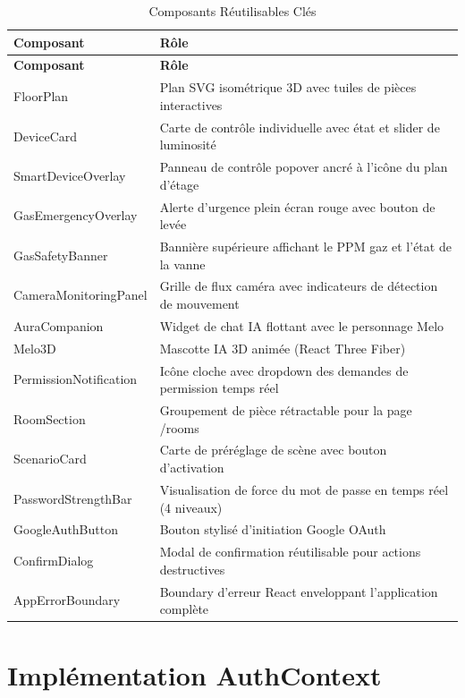 \begin{center}
\begin{longtable}{p{} p{}}
\caption{Composants Réutilisables Clés}\label{tab:components}\\
\toprule
\textbf{Composant} & \textbf{Rôle} \\
\midrule
\endfirsthead
\toprule
\textbf{Composant} & \textbf{Rôle} \\
\midrule
\endhead
\bottomrule
\endfoot
FloorPlan               & Plan SVG isométrique 3D avec tuiles de pièces interactives \\
DeviceCard              & Carte de contrôle individuelle avec état et slider de luminosité \\
SmartDeviceOverlay      & Panneau de contrôle popover ancré à l'icône du plan d'étage \\
GasEmergencyOverlay     & Alerte d'urgence plein écran rouge avec bouton de levée \\
GasSafetyBanner         & Bannière supérieure affichant le PPM gaz et l'état de la vanne \\
CameraMonitoringPanel   & Grille de flux caméra avec indicateurs de détection de mouvement \\
AuraCompanion           & Widget de chat IA flottant avec le personnage Melo \\
Melo3D                  & Mascotte IA 3D animée (React Three Fiber) \\
PermissionNotification  & Icône cloche avec dropdown des demandes de permission temps réel \\
RoomSection             & Groupement de pièce rétractable pour la page /rooms \\
ScenarioCard            & Carte de préréglage de scène avec bouton d'activation \\
PasswordStrengthBar     & Visualisation de force du mot de passe en temps réel (4 niveaux) \\
GoogleAuthButton        & Bouton stylisé d'initiation Google OAuth \\
ConfirmDialog           & Modal de confirmation réutilisable pour actions destructives \\
AppErrorBoundary        & Boundary d'erreur React enveloppant l'application complète \\
\end{longtable}
\end{center}

\section{Implémentation AuthContext}

